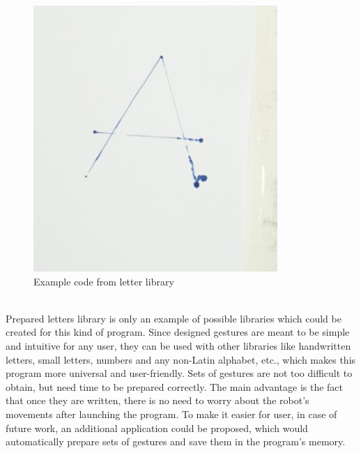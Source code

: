 \begin{figure}[H]
	\includegraphics{letter}
	\centering
	\caption{Example code from letter library}
	\label{fig:letter}
\end{figure}

\mbox{}\\
Prepared letters library is only an example of possible libraries which could be created for this kind of program. Since designed gestures are meant to be simple and intuitive for any user, they can be used with other libraries like handwritten letters, small letters, numbers and any non-Latin alphabet, etc., which makes this program more universal and user-friendly. Sets of gestures are not too difficult to obtain, but need time to be prepared correctly. The main advantage is the fact that once they are written, there is no need to worry about the robot’s movements after launching the program. To make it easier for user, in case of future work, an additional application could be proposed, which would automatically prepare sets of gestures and save them in the program’s memory.
